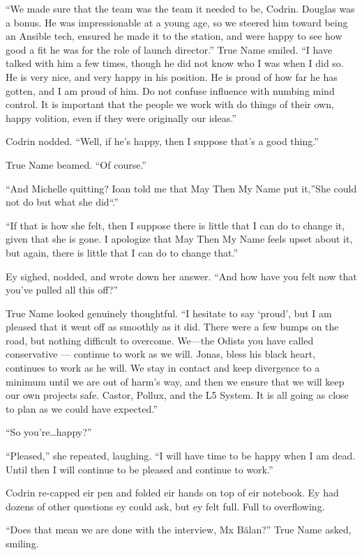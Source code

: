 ``We made sure that the team was the team it needed to be, Codrin. Douglas was a bonus. He was impressionable at a young age, so we steered him toward being an Ansible tech, ensured he made it to the station, and were happy to see how good a fit he was for the role of launch director.'' True Name smiled. ``I have talked with him a few times, though he did not know who I was when I did so. He is very nice, and very happy in his position. He is proud of how far he has gotten, and I am proud of him. Do not confuse influence with numbing mind control. It is important that the people we work with do things of their own, happy volition, even if they were originally our ideas.''

Codrin nodded. ``Well, if he's happy, then I suppose that's a good thing.''

True Name beamed. ``Of course.''

``And Michelle quitting? Ioan told me that May Then My Name put it,''She could not do but what she did``.''

``If that is how she felt, then I suppose there is little that I can do to change it, given that she is gone. I apologize that May Then My Name feels upset about it, but again, there is little that I can do to change that.''

Ey sighed, nodded, and wrote down her answer. ``And how have you felt now that you've pulled all this off?''

True Name looked genuinely thoughtful. ``I hesitate to say `proud', but I am pleased that it went off as smoothly as it did. There were a few bumps on the road, but nothing difficult to overcome. We---the Odists you have called conservative — continue to work as we will. Jonas, bless his black heart, continues to work as he will. We stay in contact and keep divergence to a minimum until we are out of harm's way, and then we ensure that we will keep our own projects safe. Castor, Pollux, and the L5 System. It is all going as close to plan as we could have expected.''

``So you're\ldots happy?''

``Pleased,'' she repeated, laughing. ``I will have time to be happy when I am dead. Until then I will continue to be pleased and continue to work.''

Codrin re-capped eir pen and folded eir hands on top of eir notebook. Ey had dozens of other questions ey could ask, but ey felt full. Full to overflowing.

``Does that mean we are done with the interview, Mx Bălan?'' True Name asked, smiling.

